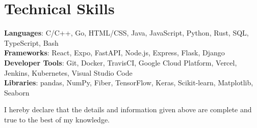 \documentclass[letterpaper,11pt]{article}
\begin{document}
\section{Technical Skills}
 \begin{itemize}[leftmargin=0.15in, label={}]
    \small{\item{
     \textbf{Languages}{: C/C++, Go, HTML/CSS, Java, JavaScript, Python, Rust, SQL, TypeScript, Bash} \\
     \textbf{Frameworks}{: React, Expo, FastAPI, Node.js, Express, Flask, Django} \\
     \textbf{Developer Tools}{: Git, Docker, TravisCI, Google Cloud Platform, Vercel, Jenkins, Kubernetes, Visual Studio Code} \\
     \textbf{Libraries}{: pandas, NumPy, Fiber, TensorFlow, Keras, Scikit-learn, Matplotlib, Seaborn} \\
    }}
 \end{itemize}

\vspace{2em}
\begin{center}
    \small I hereby declare that the details and information given above are complete and true to the best of my knowledge.
\end{center}
\end{document}
